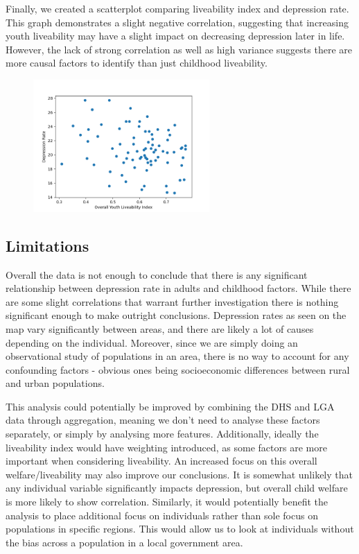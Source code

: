 \documentclass[a4, 11pt]{article}
\begin{document}
\newpage

Finally, we created a scatterplot comparing liveability index and depression rate. This graph demonstrates a slight negative correlation, suggesting that increasing youth liveability may have a slight impact on decreasing depression later in life. However, the lack of strong correlation as well as high variance suggests there are more causal factors to identify than just childhood liveability.

\begin{figure}[ht]
    \centering
    \includegraphics[width=0.6\textwidth]{./plots/overallscatterminMax.png}
    \label{fig:my_label}
\end{figure}

\subsection{Limitations}

Overall the data is not enough to conclude that there is any significant relationship between depression rate in adults and childhood factors. While there are some slight correlations that warrant further investigation there is nothing significant enough to make outright conclusions. Depression rates as seen on the map vary significantly between areas, and there are likely a lot of causes depending on the individual. Moreover, since we are simply doing an observational study of populations in an area, there is no way to account for any confounding factors - obvious ones being socioeconomic differences between rural and urban populations.

This analysis could potentially be improved by combining the DHS and LGA data through aggregation, meaning we don’t need to analyse these factors separately, or simply by analysing more features. Additionally, ideally the liveability index would have weighting introduced, as some factors are more important when considering liveability. An increased focus on this overall welfare/liveability may also improve our conclusions. It is somewhat unlikely that any individual variable significantly impacts depression, but overall child welfare is more likely to show correlation. Similarly, it would potentially benefit the analysis to place additional focus on individuals rather than sole focus on populations in specific regions.  This would allow us to look at individuals without the bias across a population in a local government area.
\end{document}
